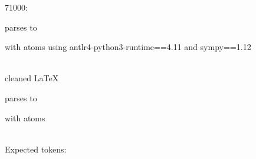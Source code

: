 \documentclass{article}
\begin{document}
\hrulefill


71000:

parses to

with atoms
using antlr4-python3-runtime==4.11 and sympy==1.12

\ \\
cleaned \LaTeX

parses to

with atoms


\ \\
Expected tokens:



\hrulefill
\end{document}
